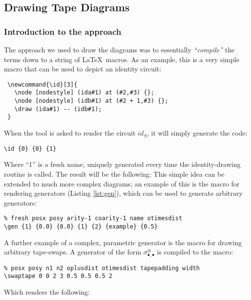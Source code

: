 \documentclass{article}
\begin{document}
\subsection{Drawing Tape Diagrams}

\subsubsection{Introduction to the approach}

The approach we used to draw the diagrams was to essentially \emph{``compile''} the terms down to a string of \LaTeX \, macros. As an example, this is a very simple macro that can be used to depict an identity circuit:

\begin{lstlisting}[caption=\LaTeX \, macro for rendering identities.]
 % fresh posx posy
 \newcommand{\id}[3]{
   \node [nodestyle] (ida#1) at (#2,#3) {};
   \node [nodestyle] (idb#1) at (#2 + 1,#3) {};
   \draw (ida#1) -- (idb#1);
 }
\end{lstlisting}
When the tool is asked to render the circuit $id_S$, it will simply generate the code:
\begin{lstlisting}
\id {0} {0} {1}
\end{lstlisting}
Where ``1'' is a fresh name, uniquely generated every time the identity-drawing routine is called. The result will be the following:
This simple idea can be extended to much more complex diagrams; an example of this is the macro for rendering generators (Listing \ref{lst:gen}), which can be used to generate arbitrary generators:

\begin{lstlisting}
% fresh posx posy arity-1 coarity-1 name otimesdist
\gen {1} {0.0} {0.0} {1} {2} {example} {0.5}
\end{lstlisting}

A further example of a complex, parametric generator is the macro for drawing arbitrary tape-swaps. A generator of the form $\sigma^{\oplus}_{\bullet, \bullet}$ is compiled to the macro:

\begin{lstlisting}
% posx posy n1 n2 oplusdist otimesdist tapepadding width
\swaptape 0 0 2 3 0.5 0.5 0.5 2
\end{lstlisting}
Which renders the following:
\end{document}
